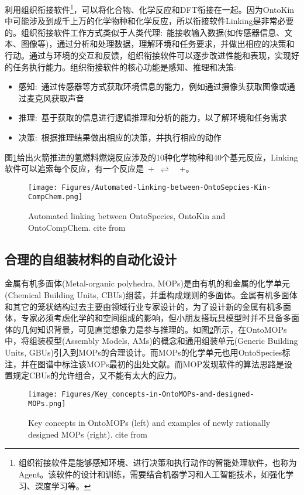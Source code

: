 利用组织衔接软件\footnote{组织衔接软件是能够感知环境、进行决策和执行动作的智能处理软件，也称为\textrm{Agent}。该软件的设计和训练，需要结合机器学习和人工智能技术，如强化学习、深度学习等。}，可以将化合物、化学反应和\textrm{DFT}衔接在一起。因为\textrm{OntoKin}中可能涉及到成千上万的化学物种和化学反应，所以衔接软件\textrm{Linking}是非常必要的。组织衔接软件工作方式类似于人类代理:~能接收输入数据(如传感器信息、文本、图像等)，通过分析和处理数据，理解环境和任务要求，并做出相应的决策和行动。通过与环境的交互和反馈，组织衔接软件可以逐步改进性能和表现，实现好的任务执行能力。组织衔接软件的核心功能是感知、推理和决策:
\begin{itemize}
	\item 感知:~通过传感器等方式获取环境信息的能力，例如通过摄像头获取图像或通过麦克风获取声音
	\item 推理:~基于获取的信息进行逻辑推理和分析的能力，以了解环境和任务需求
	\item 决策:~根据推理结果做出相应的决策，并执行相应的动作 
\end{itemize}
图\ref{Fig:Automated-linking-between-OntoSpecies-Kin-CompChem}给出火箭推进的氢燃料燃烧反应涉及的10种化学物种和40个基元反应，\textrm{Linking}软件可以追索每个反应，有一个反应是~+~$\rightleftharpoons$~~+。
\begin{figure}[h!]
\centering
\texttt{[image: Figures/Automated-linking-between-OntoSepcies-Kin-CompChem.png]}
\caption{\small\textrm{Automated linking between OntoSpecies, OntoKin and OntoCompChem. cite from~\cite{ACR56-128_2023}}}%
\label{Fig:Automated-linking-between-OntoSpecies-Kin-CompChem}
\end{figure}
\subsection{合理的自组装材料的自动化设计}
金属有机多面体\textrm{(Metal-organic polyhedra, MOPs)}是由有机的和金属的化学单元\textrm{(Chemical Building Units, CBUs)}组装，并重构成规则的多面体。金属有机多面体和其它的笼状结构过去主要由领域行业专家设计的，为了设计新的金属有机多面体，专家必须考虑化学的和空间组成的影响，但小朋友搭玩具模型时并不具备多面体的几何知识背景，可见直觉想象力是参与推理的。如图\ref{Fig:OntoMOPs-MOPs}所示，在\textrm{OntoMOPs}中，将组装模型\textrm{(Assembly Models, AMs)}的概念和通用组装单元\textrm{(Generic Building Units, GBUs)}引入到\textrm{MOPs}的合理设计。而\textrm{MOPs}的化学单元也用\textrm{OntoSpecies}标注，并在图谱中标注该\textrm{MOPs}最初的出处文献。而\textrm{MOP}发现软件的算法思路是设置规定\textrm{CBUs}的允许组合，又不能有太大的应力。
\begin{figure}[h!]
\centering
\texttt{[image: Figures/Key\_concepts-in-OntoMOPs-and-designed-MOPs.png]}
\caption{\small\textrm{Key concepts in OntoMOPs (left) and examples of newly rationally designed MOPs (right). cite from~\cite{ACR56-128_2023}}}%
\label{Fig:OntoMOPs-MOPs}
\end{figure}
